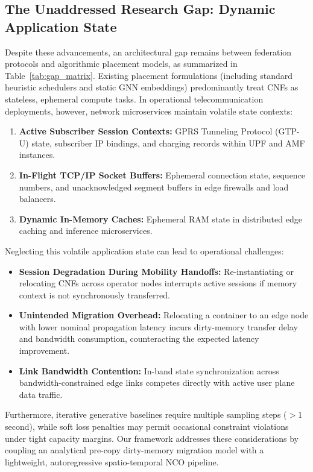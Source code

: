 \documentclass[conference]{IEEEtran}
\begin{document}
\subsection{The Unaddressed Research Gap: Dynamic Application State}
Despite these advancements, an architectural gap remains between federation protocols and algorithmic placement models, as summarized in Table~\ref{tab:gap_matrix}. Existing placement formulations (including standard heuristic schedulers and static GNN embeddings) predominantly treat CNFs as stateless, ephemeral compute tasks. In operational telecommunication deployments, however, network microservices maintain volatile state contexts:
\begin{enumerate}
    \item \textbf{Active Subscriber Session Contexts:} GPRS Tunneling Protocol (GTP-U) state, subscriber IP bindings, and charging records within UPF and AMF instances.
    \item \textbf{In-Flight TCP/IP Socket Buffers:} Ephemeral connection state, sequence numbers, and unacknowledged segment buffers in edge firewalls and load balancers.
    \item \textbf{Dynamic In-Memory Caches:} Ephemeral RAM state in distributed edge caching and inference microservices.
\end{enumerate}

Neglecting this volatile application state can lead to operational challenges:
\begin{itemize}
    \item \textbf{Session Degradation During Mobility Handoffs:} Re-instantiating or relocating CNFs across operator nodes interrupts active sessions if memory context is not synchronously transferred.
    \item \textbf{Unintended Migration Overhead:} Relocating a container to an edge node with lower nominal propagation latency incurs dirty-memory transfer delay and bandwidth consumption, counteracting the expected latency improvement.
    \item \textbf{Link Bandwidth Contention:} In-band state synchronization across bandwidth-constrained edge links competes directly with active user plane data traffic.
\end{itemize}

Furthermore, iterative generative baselines require multiple sampling steps ($>1$\,second), while soft loss penalties may permit occasional constraint violations under tight capacity margins. Our framework addresses these considerations by coupling an analytical pre-copy dirty-memory migration model with a lightweight, autoregressive spatio-temporal NCO pipeline.
\end{document}
